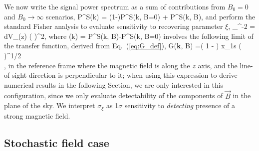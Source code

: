 We now write the signal power spectrum as a sum of contributions from $B_0=0$ and $B_0\to\infty$ scenarios, 
\beq
P^S(\vec k) = (1-\xi)P^S(\vec k, B=0) + \xi P^S(\vec k, B\to \infty),
\label{eq:saturated_P}
\eeq
and perform the standard Fisher analysis to evaluate sensitivity to recovering parameter $\xi$,
\beq
\bga
\sigma_{\xi}^{-2} = 
\int dV_\mathrm{}(z)
\left(  \right)^2,
\ega
\label{eq:sigma_xi}
\eeq
where
\beq
{}(\vec k) = P^S(\vec k, B\to \infty)-P^S(\vec k, B=0)
\eeq
involves the following limit of the transfer function, derived from Eq.~(\ref{eq:G_def}),
\beq
\bga
G({\bf{\widehat k}}, B\to \infty)
=\left( 1 -  \right) x_{1{\rm s}} \left(  \right)^{1/2} \\
\times {} ,
\label{eq:G_Binf}
\ega
\eeq
in the reference frame where the magnetic field is along the $z$ axis, and the line-of-sight direction is perpendicular to it; when using this expression to derive numerical results in the following Section, we are only interested in this configuration, since we only evaluate detectability of the components of $\vec B$ in the plane of the sky. We interpret $\sigma_\xi$ as 1$\sigma$ sensitivity to \textit{detecting} presence of a strong magnetic field. 

\subsection{Stochastic field case}
\label{subsec:SI_fisher}

